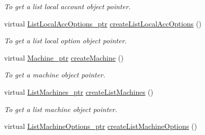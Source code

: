 \begin{DoxyCompactItemize}
\begin{DoxyCompactList}\small\item\em To get a list local account object pointer. \item\end{DoxyCompactList}\item 
\hypertarget{classUMS__Data_1_1UMS__DataFactory_a6d87a4d8bbec1a8d78c2c10c01e89a01}{
virtual \hyperlink{classUMS__Data_1_1ListLocalAccOptions}{ListLocalAccOptions\_\-ptr} \hyperlink{classUMS__Data_1_1UMS__DataFactory_a6d87a4d8bbec1a8d78c2c10c01e89a01}{createListLocalAccOptions} ()}
\label{classUMS__Data_1_1UMS__DataFactory_a6d87a4d8bbec1a8d78c2c10c01e89a01}

\begin{DoxyCompactList}\small\item\em To get a list local option object pointer. \item\end{DoxyCompactList}\item 
\hypertarget{classUMS__Data_1_1UMS__DataFactory_a1a8e80f7626fc15c7b2b0c4b3efa885c}{
virtual \hyperlink{classUMS__Data_1_1Machine}{Machine\_\-ptr} \hyperlink{classUMS__Data_1_1UMS__DataFactory_a1a8e80f7626fc15c7b2b0c4b3efa885c}{createMachine} ()}
\label{classUMS__Data_1_1UMS__DataFactory_a1a8e80f7626fc15c7b2b0c4b3efa885c}

\begin{DoxyCompactList}\small\item\em To get a machine object pointer. \item\end{DoxyCompactList}\item 
\hypertarget{classUMS__Data_1_1UMS__DataFactory_a0e31114fb77b99062b97d13fed35e49e}{
virtual \hyperlink{classUMS__Data_1_1ListMachines}{ListMachines\_\-ptr} \hyperlink{classUMS__Data_1_1UMS__DataFactory_a0e31114fb77b99062b97d13fed35e49e}{createListMachines} ()}
\label{classUMS__Data_1_1UMS__DataFactory_a0e31114fb77b99062b97d13fed35e49e}

\begin{DoxyCompactList}\small\item\em To get a list machine object pointer. \item\end{DoxyCompactList}\item 
\hypertarget{classUMS__Data_1_1UMS__DataFactory_a7109631b57588db42777e637a9cf02c6}{
virtual \hyperlink{classUMS__Data_1_1ListMachineOptions}{ListMachineOptions\_\-ptr} \hyperlink{classUMS__Data_1_1UMS__DataFactory_a7109631b57588db42777e637a9cf02c6}{createListMachineOptions} ()}
\label{classUMS__Data_1_1UMS__DataFactory_a7109631b57588db42777e637a9cf02c6}


\end{DoxyCompactItemize}

